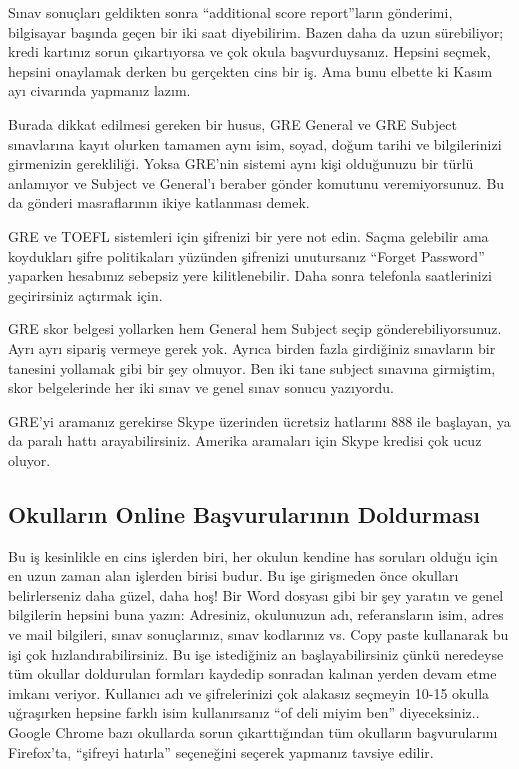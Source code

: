 \documentclass[12pt]{article}
\begin{document}
Sınav sonuçları geldikten sonra ``additional score report''ların gönderimi, bilgisayar başında geçen bir iki saat diyebilirim. Bazen daha da uzun sürebiliyor; kredi kartınız sorun çıkartıyorsa ve çok okula başvurduysanız. Hepsini seçmek, hepsini onaylamak derken bu gerçekten cins bir iş. Ama bunu elbette ki Kasım ayı civarında yapmanız lazım. 

Burada dikkat edilmesi gereken bir husus, GRE General ve GRE Subject sınavlarına kayıt olurken tamamen aynı isim, soyad, doğum tarihi ve bilgilerinizi girmenizin gerekliliği. Yoksa GRE'nin sistemi aynı kişi olduğunuzu bir türlü anlamıyor ve Subject ve General'ı beraber gönder komutunu veremiyorsunuz. Bu da gönderi masraflarının ikiye katlanması demek. 

GRE ve TOEFL sistemleri için şifrenizi bir yere not edin. Saçma gelebilir ama koydukları şifre politikaları yüzünden şifrenizi unutursanız ``Forget Password'' yaparken hesabınız sebepsiz yere kilitlenebilir. Daha sonra telefonla saatlerinizi geçirirsiniz açtırmak için. 

GRE skor belgesi yollarken hem General hem Subject seçip gönderebiliyorsunuz. Ayrı ayrı sipariş vermeye gerek yok. Ayrıca birden fazla girdiğiniz sınavların bir tanesini yollamak gibi bir şey olmuyor. Ben iki tane subject sınavına girmiştim, skor belgelerinde her iki sınav ve genel sınav sonucu yazıyordu. 

GRE'yi aramanız gerekirse Skype üzerinden ücretsiz hatlarını 888 ile başlayan, ya da paralı hattı arayabilirsiniz. Amerika aramaları için Skype kredisi çok ucuz oluyor.  

\subsection{Okulların Online Başvurularının Doldurması}
Bu iş kesinlikle en cins işlerden biri, her okulun kendine has soruları olduğu için en uzun zaman alan işlerden birisi budur. Bu işe girişmeden önce okulları belirlerseniz daha güzel, daha hoş! Bir Word dosyası gibi bir şey yaratın ve genel bilgilerin hepsini buna yazın: Adresiniz, okulunuzun adı, referansların isim, adres ve mail bilgileri, sınav sonuçlarınız, sınav kodlarınız vs. Copy paste kullanarak bu işi çok hızlandırabilirsiniz. Bu işe istediğiniz an başlayabilirsiniz çünkü neredeyse tüm okullar doldurulan formları kaydedip sonradan kalınan yerden devam etme imkanı veriyor. Kullanıcı adı ve şifrelerinizi çok alakasız seçmeyin 10-15 okulla uğraşırken hepsine farklı isim kullanırsanız ``of deli miyim ben'' diyeceksiniz.. Google Chrome bazı okullarda sorun çıkarttığından tüm okulların başvurularını Firefox'ta, ``şifreyi hatırla'' seçeneğini seçerek yapmanız tavsiye edilir.  
\end{document}
